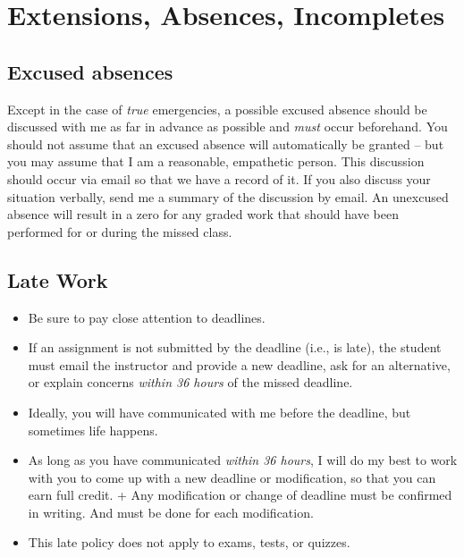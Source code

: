 \hypertarget{extensions-absences-incompletes}{%
\section{Extensions, Absences, Incompletes}\label{extensions-absences-incompletes}}

\hypertarget{excused-absences}{%
\subsection{Excused absences}\label{excused-absences}}

Except in the case of \emph{true} emergencies, a possible excused absence should be discussed with me as far in advance as possible and \emph{must} occur beforehand.
You should not assume that an excused absence will automatically be granted -- but you may assume that I am a reasonable, empathetic person.
This discussion should occur via email so that we have a record of it.
If you also discuss your situation verbally, send me a summary of the discussion by email.
An unexcused absence will result in a zero for any graded work that should have been performed for or during the missed class.

\hypertarget{late-work}{%
\subsection{Late Work}\label{late-work}}

\begin{itemize}
\tightlist
\item
  Be sure to pay close attention to deadlines.
\item
  If an assignment is not submitted by the deadline (i.e., is late), the student must email the instructor and provide a new deadline, ask for an alternative, or explain concerns \emph{within 36 hours} of the missed deadline.
\item
  Ideally, you will have communicated with me before the deadline, but sometimes life happens.
\item
  As long as you have communicated \emph{within 36 hours}, I will do my best to work with you to come up with a new deadline or modification, so that you can earn full credit. + Any modification or change of deadline must be confirmed in writing. And must be done for each modification.
\item
  This late policy does not apply to exams, tests, or quizzes.
\end{itemize}

